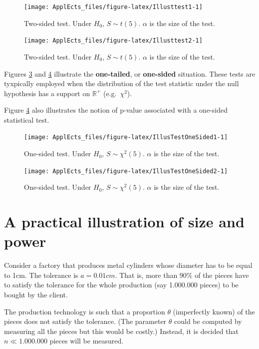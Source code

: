 \documentclass[
  12pt,
]{book}
\theoremstyle{definition}
\theoremstyle{definition}
\theoremstyle{definition}
\theoremstyle{definition}
\theoremstyle{remark}
\begin{document}
\begin{figure}
\texttt{[image: ApplEcts\_files/figure-latex/Illusttest1-1]} \caption{Two-sided test. Under $H_0$, $S \sim t(5)$. $\alpha$ is the size of the test.}\label{fig:Illusttest1}
\end{figure}

\begin{figure}
\texttt{[image: ApplEcts\_files/figure-latex/Illusttest2-1]} \caption{Two-sided test. Under $H_0$, $S \sim t(5)$. $\alpha$ is the size of the test.}\label{fig:Illusttest2}
\end{figure}

Figures \ref{fig:IllusTestOneSided1} and \ref{fig:IllusTestOneSided2} illustrate the \textbf{one-tailed}, or \textbf{one-sided} situation. These tests are tyxpically employed when the distribution of the test statistic under the null hypothesis has a support on \(\mathbb{R}^+\) (e.g.~\(\chi^2\)).

Figure \ref{fig:IllusTestOneSided2} also illustrates the notion of p-value associated with a one-sided statistical test.

\begin{figure}
\texttt{[image: ApplEcts\_files/figure-latex/IllusTestOneSided1-1]} \caption{One-sided test. Under $H_0$, $S \sim \chi^2(5)$. $\alpha$ is the size of the test.}\label{fig:IllusTestOneSided1}
\end{figure}

\begin{figure}
\texttt{[image: ApplEcts\_files/figure-latex/IllusTestOneSided2-1]} \caption{One-sided test. Under $H_0$, $S \sim \chi^2(5)$. $\alpha$ is the size of the test.}\label{fig:IllusTestOneSided2}
\end{figure}

\hypertarget{a-practical-illustration-of-size-and-power}{%
\section{A practical illustration of size and power}\label{a-practical-illustration-of-size-and-power}}

Consider a factory that produces metal cylinders whose diameter has to be equal to 1cm. The tolerance is \(a=0.01cm\). That is, more than 90\% of the pieces have to satisfy the tolerance for the whole production (say 1.000.000 pieces) to be bought by the client.

The production technology is such that a proportion \(\theta\) (imperfectly known) of the pieces does not satisfy the tolerance. (The parameter \(\theta\) could be computed by measuring all the pieces but this would be costly.) Instead, it is decided that \(n \ll 1.000.000\) pieces will be measured.
\end{document}
